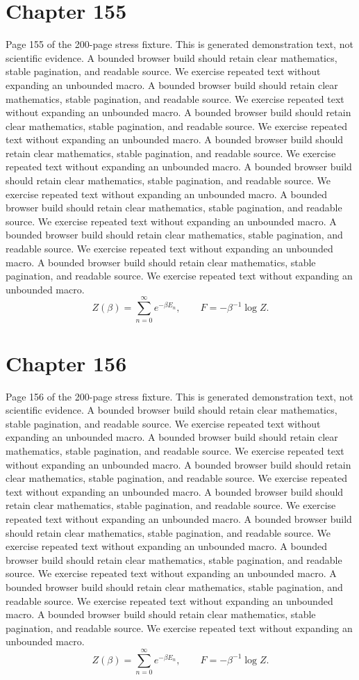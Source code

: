 \documentclass[11pt]{article}
\begin{document}
\section*{Chapter 155}
Page 155 of the 200-page stress fixture. This is generated demonstration text, not scientific evidence.
A bounded browser build should retain clear mathematics, stable pagination, and readable source. We exercise repeated text without expanding an unbounded macro.
A bounded browser build should retain clear mathematics, stable pagination, and readable source. We exercise repeated text without expanding an unbounded macro.
A bounded browser build should retain clear mathematics, stable pagination, and readable source. We exercise repeated text without expanding an unbounded macro.
A bounded browser build should retain clear mathematics, stable pagination, and readable source. We exercise repeated text without expanding an unbounded macro.
A bounded browser build should retain clear mathematics, stable pagination, and readable source. We exercise repeated text without expanding an unbounded macro.
A bounded browser build should retain clear mathematics, stable pagination, and readable source. We exercise repeated text without expanding an unbounded macro.
A bounded browser build should retain clear mathematics, stable pagination, and readable source. We exercise repeated text without expanding an unbounded macro.
A bounded browser build should retain clear mathematics, stable pagination, and readable source. We exercise repeated text without expanding an unbounded macro.
\[Z(\beta)=\sum_{n=0}^{\infty}e^{-\beta E_n},\qquad F=-\beta^{-1}\log Z.\]
\newpage
\section*{Chapter 156}
Page 156 of the 200-page stress fixture. This is generated demonstration text, not scientific evidence.
A bounded browser build should retain clear mathematics, stable pagination, and readable source. We exercise repeated text without expanding an unbounded macro.
A bounded browser build should retain clear mathematics, stable pagination, and readable source. We exercise repeated text without expanding an unbounded macro.
A bounded browser build should retain clear mathematics, stable pagination, and readable source. We exercise repeated text without expanding an unbounded macro.
A bounded browser build should retain clear mathematics, stable pagination, and readable source. We exercise repeated text without expanding an unbounded macro.
A bounded browser build should retain clear mathematics, stable pagination, and readable source. We exercise repeated text without expanding an unbounded macro.
A bounded browser build should retain clear mathematics, stable pagination, and readable source. We exercise repeated text without expanding an unbounded macro.
A bounded browser build should retain clear mathematics, stable pagination, and readable source. We exercise repeated text without expanding an unbounded macro.
A bounded browser build should retain clear mathematics, stable pagination, and readable source. We exercise repeated text without expanding an unbounded macro.
\[Z(\beta)=\sum_{n=0}^{\infty}e^{-\beta E_n},\qquad F=-\beta^{-1}\log Z.\]
\newpage
\end{document}
